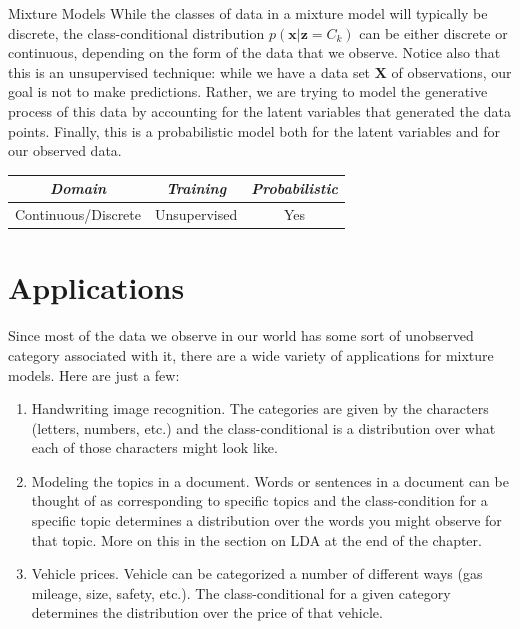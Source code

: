 \begin{mlcube}{Mixture Models}
While the classes of data in a mixture model will typically be discrete, the class-conditional distribution $p(\textbf{x} | \textbf{z} = C_k)$ can be either discrete or continuous, depending on the form of the data that we observe. Notice also that this is an unsupervised technique: while we have a data set $\textbf{X}$ of observations, our goal is not to make predictions. Rather, we are trying to model the generative process of this data by accounting for the latent variables that generated the data points. Finally, this is a probabilistic model both for the latent variables and for our observed data.
\begin{center}
    \begin{tabular}{c|c|c}
    \textit{\textbf{Domain}} & \textit{\textbf{Training}} & \textit{\textbf{Probabilistic}} \\
    \hline
    Continuous/Discrete & Unsupervised & Yes \\
    \end{tabular}
\end{center}
\end{mlcube}

\section{Applications}
Since most of the data we observe in our world has some sort of unobserved category associated with it, there are a wide variety of applications for mixture models. Here are just a few:
\begin{enumerate}
    \item Handwriting image recognition. The categories are given by the characters (letters, numbers, etc.) and the class-conditional is a distribution over what each of those characters might look like.
    \item Modeling the topics in a document. Words or sentences in a document can be thought of as corresponding to specific topics and the class-condition for a specific topic determines a distribution over the words you might observe for that topic. More on this in the section on LDA at the end of the chapter.
    \item Vehicle prices. Vehicle can be categorized a number of different ways (gas mileage, size, safety, etc.). The class-conditional for a given category determines the distribution over the price of that vehicle.
\end{enumerate}

